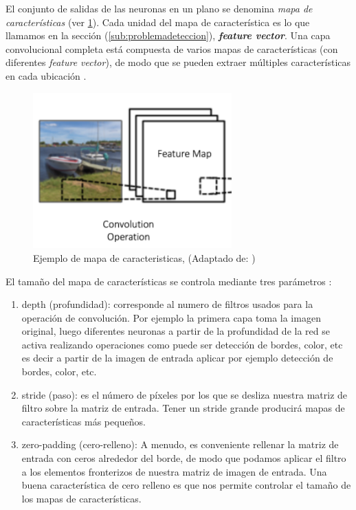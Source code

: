 El conjunto de salidas de las neuronas en un plano se denomina \textit{mapa de características} (ver \ref{Fig: fmaps}). Cada unidad  del mapa de característica es lo que llamamos en la sección (\ref{sub:problemadeteccion}),  \textit{\textbf{feature vector}}. Una capa convolucional completa está compuesta de varios mapas de características (con diferentes 
\textit{feature vector}), de modo que se pueden extraer múltiples características en cada ubicación \citep{cnns}.

\begin{figure}[H]
 \centering
  \includegraphics[height=6cm,keepaspectratio=true,clip=true]{imagenes/Logos/fmaps.png}
  \caption{Ejemplo de mapa de caracteristicas, (Adaptado de: \citep{cnnsarticle})}
	\label{Fig: fmaps}
\end{figure}

El tamaño del mapa de características se controla mediante tres parámetros \citep{cnnsarticle}:
\begin{enumerate}
\item depth (profundidad): corresponde al numero de filtros usados para la operación de convolución. Por ejemplo la primera capa toma la imagen original, luego diferentes neuronas a partir de la profundidad de la red se activa realizando operaciones como puede ser detección de bordes, color, etc
es decir a partir de la imagen de entrada aplicar por ejemplo detección de bordes, color, etc.
\item stride (paso): es el número de píxeles por los que se desliza nuestra matriz de filtro sobre la matriz de entrada. Tener un stride grande producirá mapas de características más pequeños.
\item zero-padding (cero-relleno): A menudo, es conveniente rellenar la matriz de entrada con ceros alrededor del borde, de modo que podamos aplicar el filtro a los elementos fronterizos de nuestra matriz de imagen de entrada. Una buena característica de cero relleno es que nos permite controlar el tamaño de los mapas de características.
\end{enumerate}



